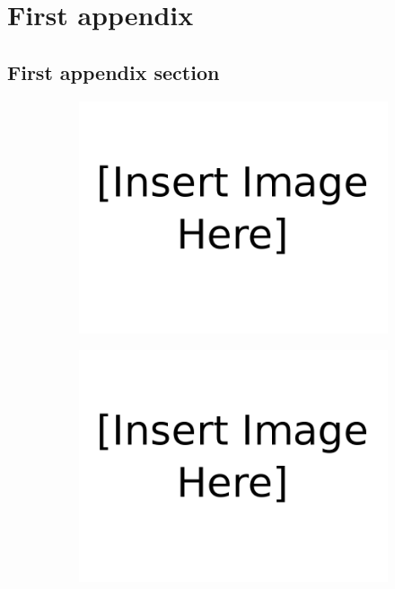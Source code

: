 \chapter{First appendix}
\label{First appendix}

\section{First appendix section}
\label{First appendix section}


\begin{figure}[H]
        \centering
        \begin{subfigure}[b]{0.48\textwidth}
            \centering
            \includegraphics[width=\textwidth]{figures/Insert_image_here.png}
            \caption{}
            \label{fig:test1}
        \end{subfigure}
        \hfill
        \begin{subfigure}[b]{0.48\textwidth}  
            \centering 
            \includegraphics[width=\textwidth]{figures/Insert_image_here.png}

\end{subfigure}
\end{figure}
